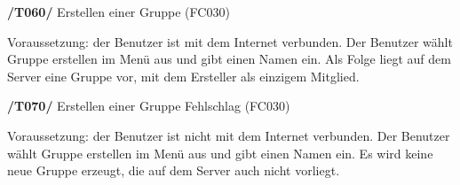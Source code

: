 \textbf{/T060/} Erstellen einer Gruppe (FC030)\\
\begin{itemize}
Voraussetzung: der Benutzer ist mit dem Internet verbunden.
Der Benutzer wählt Gruppe erstellen im Menü aus und gibt einen Namen ein.
Als Folge liegt auf dem Server eine Gruppe vor, mit dem Ersteller als einzigem Mitglied.
\end{itemize}

\textbf{/T070/} Erstellen einer Gruppe Fehlschlag (FC030)\\
\begin{itemize}
Voraussetzung: der Benutzer ist nicht mit dem Internet verbunden.
Der Benutzer wählt Gruppe erstellen im Menü aus und gibt einen Namen ein.
Es wird keine neue Gruppe erzeugt, die auf dem Server auch nicht vorliegt.
\end{itemize}

